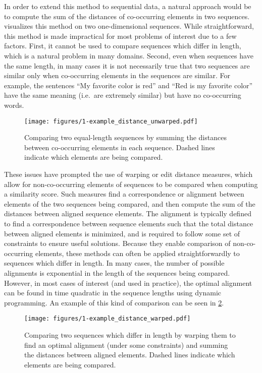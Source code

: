 In order to extend this method to sequential data, a natural approach would be to compute the sum of the distances of co-occurring elements in two sequences.
 visualizes this method on two one-dimensional sequences.
While straightforward, this method is made impractical for most problems of interest due to a few factors.
First, it cannot be used to compare sequences which differ in length, which is a natural problem in many domains.
Second, even when sequences have the same length, in many cases it is not necessarily true that two sequences are similar only when co-occurring elements in the sequences are similar.
For example, the sentences ``My favorite color is red'' and ``Red is my favorite color'' have the same meaning (i.e.\ are extremely similar) but have no co-occurring words.

\begin{figure}
  \texttt{[image: figures/1-example\_distance\_unwarped.pdf]}
  \caption[Comparing two sequences without warping]{Comparing two equal-length sequences by summing the distances between co-occurring elements in each sequence.  Dashed lines indicate which elements are being compared.}
  \label{fig:example_distance_unwarped}
\end{figure}

These issues have prompted the use of warping or edit distance measures, which allow for non-co-occurring elements of sequences to be compared when computing a similarity score.
Such measures find a correspondence or alignment between elements of the two sequences being compared, and then compute the sum of the distances between aligned sequence elements.
The alignment is typically defined to find a correspondence between sequence elements such that the total distance between aligned elements is minimized, and is required to follow some set of constraints to ensure useful solutions.
Because they enable comparison of non-co-occurring elements, these methods can often be applied straightforwardly to sequences which differ in length.
In many cases, the number of possible alignments is exponential in the length of the sequences being compared.
However, in most cases of interest (and used in practice), the optimal alignment can be found in time quadratic in the sequence lengths using dynamic programming.
An example of this kind of comparison can be seen in \cref{fig:example_distance_warped}.

\begin{figure}
  \texttt{[image: figures/1-example\_distance\_warped.pdf]}
  \caption[Comparing sequences under a warping measure]{Comparing two sequences which differ in length by warping them to find an optimal alignment (under some constraints) and summing the distances between aligned elements.  Dashed lines indicate which elements are being compared.}
  \label{fig:example_distance_warped}
\end{figure}

